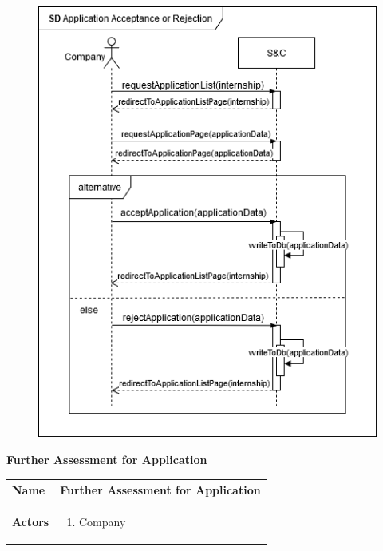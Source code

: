 \begin{enumerate}[label=\textbf{[US\arabic*]}, left = 0pt, align = left, resume]
            \newpage
            \begin{figure}[h!]
                \centering  \includegraphics[width=1\textwidth]{RASD/Images/UseCases/US14_ApplicationAcceptanceRejection.drawio.png}
                \label{fig:example}
            \end{figure}

            \newpage
            \item \textbf{Further Assessment for Application}
            
            \begin{longtable}{|l|p{11cm}|}  
                \hline
                \textbf{Name} & 
                    \textbf{Further Assessment for Application} \\
                \hline
                
                \textbf{Actors} & 
                    \begin{enumerate}[label=\textbullet, itemsep=0em]
                        \item Company
                    \end{enumerate} \\
                \hline
                

\end{longtable}
\end{enumerate}
